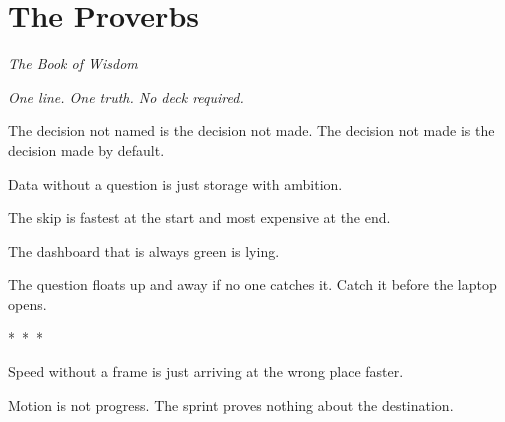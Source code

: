\chapter{The Proverbs}
\begin{center}
  \small\itshape The Book of Wisdom
\end{center}
\vspace{0.5em}
\begin{center}
  \itshape One line. One truth. No deck required.
\end{center}
\vspace{2em}


The decision not named is the decision not made. The decision not made is the decision made by default.


Data without a question is just storage with ambition.


The skip is fastest at the start and most expensive at the end.


The dashboard that is always green is lying.


The question floats up and away if no one catches it. Catch it before the laptop opens.

\vspace{1.5em}
\begin{center}
  *~*~*
\end{center}
\vspace{1.5em}


Speed without a frame is just arriving at the wrong place faster.


Motion is not progress. The sprint proves nothing about the destination.



